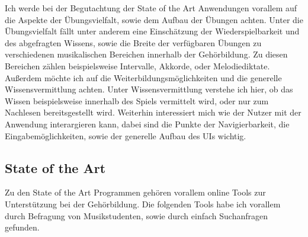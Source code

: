 Ich werde bei der Begutachtung der State of the Art Anwendungen vorallem auf die Aspekte der Übungsvielfalt, sowie dem Aufbau der Übungen achten. Unter die Übungsvielfalt fällt unter anderem eine Einschätzung der Wiederspielbarkeit und des abgefragten Wissens, sowie die Breite der verfügbaren Übungen zu verschiedenen musikalischen Bereichen innerhalb der Gehörbildung. Zu diesen Bereichen zählen beispielsweise Intervalle, Akkorde, oder Melodiediktate.
Außerdem möchte ich auf die Weiterbildungsmöglichkeiten und die generelle Wissensvermittlung achten. Unter Wissensvermittlung verstehe ich hier, ob das Wissen beispielsweise innerhalb des Spiels vermittelt wird, oder nur zum Nachlesen bereitsgestellt wird. 
Weiterhin interessiert mich wie der Nutzer mit der Anwendung interargieren kann, dabei sind die Punkte der Navigierbarkeit, die Eingabemöglichkeiten, sowie der generelle Aufbau des UIs wichtig. 

\subsection{State of the Art}

Zu den State of the Art Programmen gehören vorallem online Tools zur Unterstützung bei der Gehörbildung. Die folgenden Tools habe ich vorallem durch Befragung von Musikstudenten, sowie durch einfach Suchanfragen gefunden.

